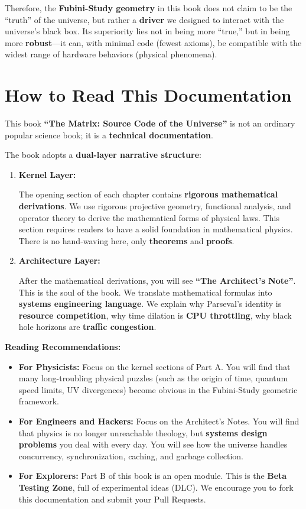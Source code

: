 Therefore, the \textbf{Fubini-Study geometry} in this book does not claim to be the ``truth'' of the universe, but rather a \textbf{driver} we designed to interact with the universe's black box. Its superiority lies not in being more ``true,'' but in being more \textbf{robust}---it can, with minimal code (fewest axioms), be compatible with the widest range of hardware behaviors (physical phenomena).

\section{How to Read This Documentation}

This book \textbf{``The Matrix: Source Code of the Universe''} is not an ordinary popular science book; it is a \textbf{technical documentation}.

The book adopts a \textbf{dual-layer narrative structure}:

\begin{enumerate}
\item \textbf{Kernel Layer:}

   The opening section of each chapter contains \textbf{rigorous mathematical derivations}. We use rigorous projective geometry, functional analysis, and operator theory to derive the mathematical forms of physical laws. This section requires readers to have a solid foundation in mathematical physics. There is no hand-waving here, only \textbf{theorems} and \textbf{proofs}.

\item \textbf{Architecture Layer:}

   After the mathematical derivations, you will see \textbf{``The Architect's Note''}. This is the soul of the book. We translate mathematical formulas into \textbf{systems engineering language}. We explain why Parseval's identity is \textbf{resource competition}, why time dilation is \textbf{CPU throttling}, why black hole horizons are \textbf{traffic congestion}.
\end{enumerate}

\textbf{Reading Recommendations:}

\begin{itemize}
\item \textbf{For Physicists:} Focus on the kernel sections of Part A. You will find that many long-troubling physical puzzles (such as the origin of time, quantum speed limits, UV divergences) become obvious in the Fubini-Study geometric framework.

\item \textbf{For Engineers and Hackers:} Focus on the Architect's Notes. You will find that physics is no longer unreachable theology, but \textbf{systems design problems} you deal with every day. You will see how the universe handles concurrency, synchronization, caching, and garbage collection.

\item \textbf{For Explorers:} Part B of this book is an open module. This is the \textbf{Beta Testing Zone}, full of experimental ideas (DLC). We encourage you to fork this documentation and submit your Pull Requests.
\end{itemize}

